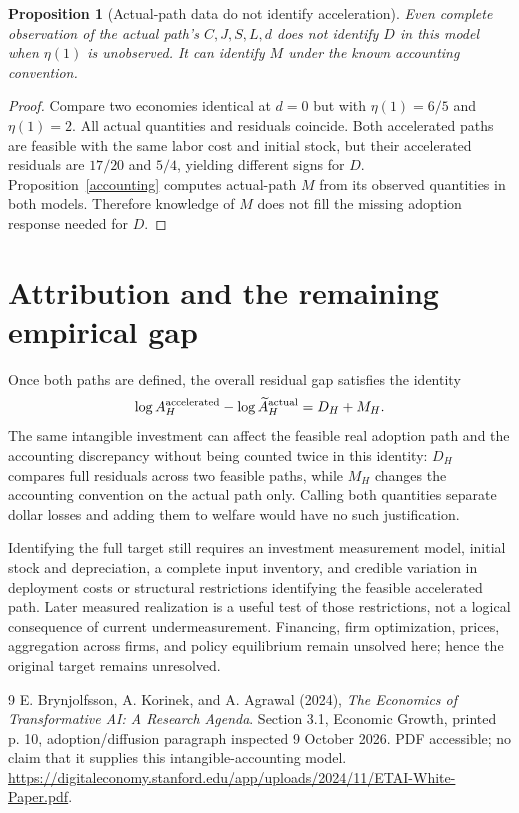 \documentclass[11pt]{article}
\newtheorem{proposition}[theorem]{Proposition}
\theoremstyle{remark}
\begin{document}
\begin{proposition}[Actual-path data do not identify acceleration]
Even complete observation of the actual path's $C,J,S,L,d$ does not identify $D$ in this model when $\eta(1)$ is unobserved. It can identify $M$ under the known accounting convention.
\end{proposition}
\begin{proof}
Compare two economies identical at $d=0$ but with $\eta(1)=6/5$ and $\eta(1)=2$. All actual quantities and residuals coincide. Both accelerated paths are feasible with the same labor cost and initial stock, but their accelerated residuals are $17/20$ and $5/4$, yielding different signs for $D$. Proposition~\ref{accounting} computes actual-path $M$ from its observed quantities in both models. Therefore knowledge of $M$ does not fill the missing adoption response needed for $D$.
\end{proof}

\section{Attribution and the remaining empirical gap}
Once both paths are defined, the overall residual gap satisfies the identity
\[
 \log A_H^{\rm accelerated}-\log\widetilde A_H^{\rm actual}=D_H+M_H.
\]
The same intangible investment can affect the feasible real adoption path and the accounting discrepancy without being counted twice in this identity: $D_H$ compares full residuals across two feasible paths, while $M_H$ changes the accounting convention on the actual path only. Calling both quantities separate dollar losses and adding them to welfare would have no such justification.

Identifying the full target still requires an investment measurement model, initial stock and depreciation, a complete input inventory, and credible variation in deployment costs or structural restrictions identifying the feasible accelerated path. Later measured realization is a useful test of those restrictions, not a logical consequence of current undermeasurement. Financing, firm optimization, prices, aggregation across firms, and policy equilibrium remain unsolved here; hence the original target remains unresolved.

\begin{thebibliography}{9}
 E. Brynjolfsson, A. Korinek, and A. Agrawal (2024), \emph{The Economics of Transformative AI: A Research Agenda}. Section 3.1, Economic Growth, printed p. 10, adoption/diffusion paragraph inspected 9 October 2026. PDF accessible; no claim that it supplies this intangible-accounting model. \url{https://digitaleconomy.stanford.edu/app/uploads/2024/11/ETAI-White-Paper.pdf}.
\end{thebibliography}
\end{document}
